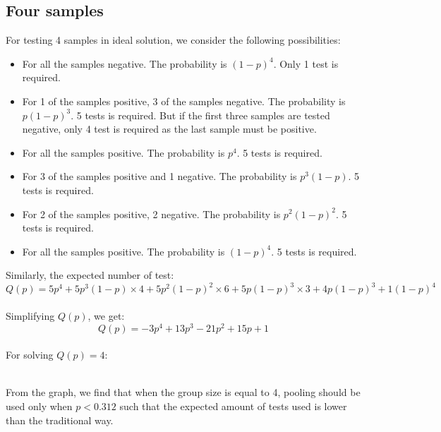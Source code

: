 \subsection{Four samples}
For testing 4 samples in ideal solution, we consider the following possibilities:

\begin{itemize}
  \item For all the samples negative. The probability is $(1-p)^4$. Only 1 test is required.
  \item For 1 of the samples positive, 3 of the samples negative. The probability is $p(1-p)^3$. 5 tests is required. But if the first three samples are tested negative, only 4 test is required as the last sample must be positive.
  \item For all the samples positive. The probability is $p^4$. 5 tests is required.
  \item For 3 of the samples positive and 1 negative. The probability is $p^3(1-p)$.  5 tests is required.
  \item For 2 of the samples positive, 2 negative. The probability is $p^2(1-p)^2$.  5 tests is required.
  \item For all the samples positive. The probability is $(1-p)^4$. 5 tests is required. 
\end{itemize}
Similarly, the expected number of test:
\\
\begin{displaymath}
Q(p)=5p^{4}+5p^{3}(1-p) \times 4+5 p^{2}(1-p)^{2} \times 6+5p(1-p)^{3} \times 3+4p(1-p)^{3}+1(1-p)^{4}
\end{displaymath}
\\
Simplifying $Q(p)$, we get:
\\
\begin{displaymath}
Q(p)=-3p^{4}+13p^{3}-21p^{2}+15p+1
\end{displaymath}
\\
For solving $Q(p)=4$:
\begin{center}
\end{center}
\\
From the graph, we find that when the group size is equal to 4, pooling should be used only when $p<0.312$ such that the expected amount of tests used is lower than the traditional way.
